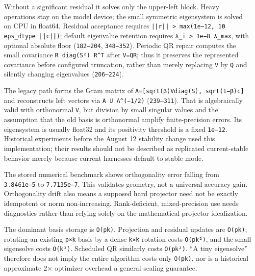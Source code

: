 \documentclass[
  british,
  10pt,
  a4paper,
]{article}
\begin{document}
Without a significant residual it solves only the upper-left block.
Heavy operations stay on the model device; the small symmetric
eigensystem is solved on CPU in float64. Residual acceptance requires
\texttt{||r|| \allowbreak{}> \allowbreak{}max(1e−12,\allowbreak{} \allowbreak{}10 \allowbreak{}eps\_\allowbreak{}dtype \allowbreak{}||c||)};
default eigenvalue retention requires
\texttt{λ\_\allowbreak{}i \allowbreak{}> \allowbreak{}1e−8 \allowbreak{}λ\_\allowbreak{}max},
with optional absolute floor (\texttt{182–204}, \texttt{348–352}).
Periodic QR repair computes the small covariance
\texttt{R \allowbreak{}diag(S²) \allowbreak{}R\textasciicircum{}T} after
\texttt{V=QR}; thus it preserves the represented covariance before
configured truncation,\allowbreak{} rather than merely replacing
\texttt{V} by \texttt{Q} and silently changing eigenvalues
(\texttt{206–224}).

The legacy path forms the Gram matrix of
\texttt{A=\allowbreak{}[sqrt(β)Vdia\allowbreak{}g(S),\allowbreak{} \allowbreak{}sqrt(1−β)c]}
and reconstructs left vectors via
\texttt{A \allowbreak{}U \allowbreak{}Λ\textasciicircum{}(−1/\allowbreak{}2)}
(\texttt{239–311}). That is algebraically valid with orthonormal
\texttt{V}, but division by small singular values and the assumption
that the old basis is orthonormal amplify finite-\allowbreak{}precision
errors. Its eigensystem is usually float32 and its positivity threshold
is a fixed \texttt{1e−12}. Historical experiments before the August 12
stability change used this implementation; their results should not be
described as replicated current-\allowbreak{}stable behavior merely
because current harnesses default to stable mode.

The stored numerical benchmark shows orthogonality error falling from
\texttt{3.8461e−5} to \texttt{7.7135e−7}. This validates geometry, not a
universal accuracy gain. Orthogonality drift also means a supposed hard
projector need not be exactly idempotent or norm
non-\allowbreak{}increasing.\allowbreak{}
Rank-\allowbreak{}deficient,\allowbreak{} mixed-\allowbreak{}precision
use needs diagnostics rather than relying solely on the mathematical
projector idealization\allowbreak{}.\allowbreak{}

The dominant basis storage is \texttt{O(pk)}. Projection and residual
updates are \texttt{O(pk)}; rotating an existing \texttt{p×k} basis by a
dense \texttt{k×k} rotation costs \texttt{O(pk²)}, and the small
eigensolve costs \texttt{O(k³)}. Scheduled QR similarly costs
\texttt{O(pk²)}. ``A tiny eigensolve'' therefore does not imply the
entire algorithm costs only \texttt{O(pk)}, nor is a historical
approximate 2× optimizer overhead a general scaling guarantee.
\end{document}
